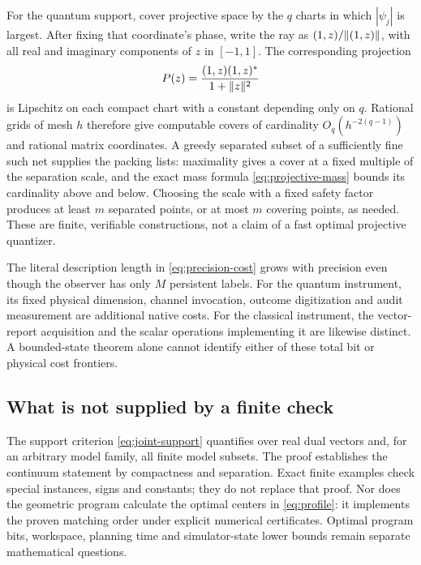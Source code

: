 For the quantum support, cover projective space by the $q$ charts in which $|\psi_j|$ is largest. After fixing that coordinate's phase, write the ray as $(1,z)/\lVert (1,z)\rVert$, with all real and imaginary components of $z$ in $[-1,1]$. The corresponding projection
\[
 P(z)=\frac{(1,z)(1,z)^*}{1+\lVert z\rVert^2}
\]
is Lipschitz on each compact chart with a constant depending only on $q$. Rational grids of mesh $h$ therefore give computable covers of cardinality $O_q(h^{-2(q-1)})$ and rational matrix coordinates. A greedy separated subset of a sufficiently fine such net supplies the packing lists: maximality gives a cover at a fixed multiple of the separation scale, and the exact mass formula \eqref{eq:projective-mass} bounds its cardinality above and below. Choosing the scale with a fixed safety factor produces at least $m$ separated points, or at most $m$ covering points, as needed. These are finite, verifiable constructions, not a claim of a fast optimal projective quantizer.

The literal description length in \eqref{eq:precision-cost} grows with precision even though the observer has only $M$ persistent labels. For the quantum instrument, its fixed physical dimension, channel invocation, outcome digitization and audit measurement are additional native costs. For the classical instrument, the vector-report acquisition and the scalar operations implementing it are likewise distinct. A bounded-state theorem alone cannot identify either of these total bit or physical cost frontiers.

\subsection*{What is not supplied by a finite check}
The support criterion \eqref{eq:joint-support} quantifies over real dual vectors and, for an arbitrary model family, all finite model subsets. The proof establishes the continuum statement by compactness and separation. Exact finite examples check special instances, signs and constants; they do not replace that proof. Nor does the geometric program calculate the optimal centers in \eqref{eq:profile}: it implements the proven matching order under explicit numerical certificates. Optimal program bits, workspace, planning time and simulator-state lower bounds remain separate mathematical questions.

